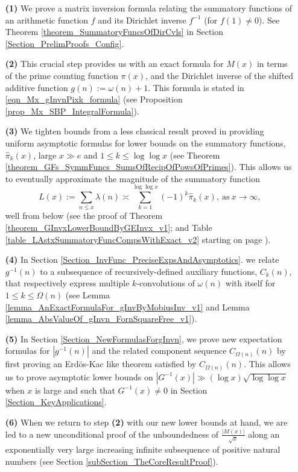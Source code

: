 \documentclass[11pt,reqno,a4letter]{article}
\numberwithin{figure}{section}
\numberwithin{table}{section}
\theoremstyle{plain}
\numberwithin{theorem}{section}
\theoremstyle{definition}
\begin{document}
\begin{itemize} 

\item[\textbf{(1)}] We prove a matrix inversion formula relating the summatory 
           functions of an arithmetic function $f$ and its Dirichlet inverse $f^{-1}$ (for $f(1) \neq 0$). 
           See Theorem \ref{theorem_SummatoryFuncsOfDirCvls} in 
           Section \ref{Section_PrelimProofs_Config}.  
\item[\textbf{(2)}] This crucial step provides us with an exact formula for $M(x)$ in terms of 
           the prime counting function $\pi(x)$, and the 
           Dirichlet inverse of the shifted additive function $g(n) := \omega(n) + 1$. This 
           formula is stated in \eqref{eqn_Mx_gInvnPixk_formula} 
           (see Proposition \ref{prop_Mx_SBP_IntegralFormula}). 
\item[\textbf{(3)}] We tighten bounds from a less classical result proved in 
            \cite[\S 7]{MV} providing uniform asymptotic formulas for lower bounds on the  
           summatory functions, $\widehat{\pi}_k(x)$, large $x \gg e$ and 
           $1 \leq k \leq \log\log x$ 
           (see Theorem \ref{theorem_GFs_SymmFuncs_SumsOfRecipOfPowsOfPrimes}). 
           This allows us to eventually approximate the magnitude of the summatory function 
           \[
           L(x) := \sum_{n \leq x} \lambda(n) \asymp 
                \sum_{k=1}^{\log\log x} (-1)^k \widehat{\pi}_k(x), 
                \mathrm{\ as\ } x \rightarrow \infty, 
           \]
           well from below (see the proof of 
           Theorem \ref{theorem_GInvxLowerBoundByGEInvx_v1}; and 
           Table \ref{table_LAstxSummatoryFuncCompsWithExact_v2} starting on page 
           \pageref{table_LAstxSummatoryFuncCompsWithExact_v2}). 
\item[\textbf{(4)}] In 
           Section \ref{Section_InvFunc_PreciseExpsAndAsymptotics}. 
           we relate $g^{-1}(n)$ to a subsequence of recursively-defined auxiliary functions, $C_k(n)$, 
           that respectively express multiple $k$-convolutions of $\omega(n)$ with itself for 
           $1 \leq k \leq \Omega(n)$ 
           (see Lemma \ref{lemma_AnExactFormulaFor_gInvByMobiusInv_v1} and 
           Lemma \ref{lemma_AbsValueOf_gInvn_FornSquareFree_v1}). 
\item[\textbf{(5)}] In Section \ref{Section_NewFormulasForgInvn}, 
           we prove new expectation formulas for $|g^{-1}(n)|$ and the related component sequence 
           $C_{\Omega(n)}(n)$ by first proving an Erd\"os-Kac like theorem satisfied by $C_{\Omega(n)}(n)$. 
           This allows us to prove asymptotic lower bounds on 
           $|G^{-1}(x)| \gg (\log x) \sqrt{\log\log x}$ when $x$ is large and such that $G^{-1}(x) \neq 0$ in 
           Section \ref{Section_KeyApplications}. 
\item[\textbf{(6)}] When we return to step \textbf{(2)} 
           with our new lower bounds at hand, we are led to a new unconditional proof of the 
           unboundedness of $\frac{|M(x)|}{\sqrt{x}}$ 
           along an exponentially very large increasing infinite subsequence of positive natural numbers 
           (see Section \ref{subSection_TheCoreResultProof}). 
           

\end{itemize}
\end{document}

